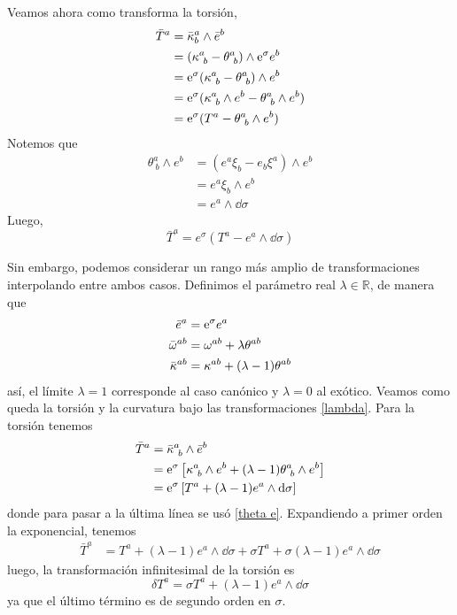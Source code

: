 Veamos ahora como transforma la torsión,
\begin{equation}\label{theta e}
\begin{split}
  \bar{T}^{a}&=\bar{\kappa}^{a}_b\wedge\bar{e}^b\\
  &=(\kappa^{a}_{~b}-\theta^{a}_{~b})\wedge\mathrm{e}^\sigma e^b\\
  &=\mathrm{e}^\sigma (\kappa^{a}_{~b}-\theta^{a}_{~b})\wedge e^b\\
  &=\mathrm{e}^\sigma (\kappa^{a}_{~b}\wedge e^b-\theta^{a}_{~b}\wedge e^b)\\
  &=\mathrm{e}^\sigma (T^{a}-\theta^{a}_{~b}\wedge e^b)
\end{split}
\end{equation}
Notemos que
\begin{equation}\label{theta e2}
\begin{split}
  \theta^{a}_{~b}\wedge e^b&=(e^{a}\xi_b-e_b\xi^{a})\wedge e^b\\
  &=e^{a}\xi_b\wedge e^b\\
  &=e^{a}\wedge\dd\sigma
\end{split}
\end{equation}
Luego,
\begin{equation}
   \boxed{\bar{T}^{a}=e^\sigma (T^{a}-e^{a}\wedge\dd\sigma)}
\end{equation}

Sin embargo, podemos considerar un rango más amplio de transformaciones interpolando entre ambos casos. Definimos el parámetro real $\lambda\in \mathbb{R}$, de manera que
\begin{subequations}\label{lambda}
\begin{align}
  \bar{e}^{a}&=\mathrm{e} ^\sigma e^{a}\label{e lambda}\\
  \bar{\omega}^{ab}&=\omega^{ab}+\lambda\theta^{ab}\label{omega lambda}\\
  \bar{\kappa}^{ab}&=\kappa^{ab}+(\lambda-1)\theta^{ab}\label{kappa lambda}
\end{align}
\end{subequations}
así, el límite $\lambda=1$ corresponde al caso canónico y $\lambda=0$ al exótico. Veamos como queda la torsión y la curvatura bajo las transformaciones \eqref{lambda}. Para la torsión tenemos
\begin{align}
  \bar{T}^{a}&=\bar{\kappa}^{a}_{~b}\wedge\bar{e}^b\\
  &=\mathrm{e}^\sigma\left[\kappa^{a}_{~b}\wedge e^b +(\lambda-1)\theta^{a}_{~b}\wedge e^b\right]\\
  &=\mathrm{e}^\sigma\left[T^{a}+(\lambda-1)e^{a}\wedge \dd\sigma\right]
\end{align}
donde para pasar a la última línea se usó \eqref{theta e}. Expandiendo a primer orden la exponencial, tenemos
\begin{align}
  \bar{T}^{a}&=T^{a}+(\lambda-1)e^{a}\wedge \dd\sigma+\sigma T^{a}+\sigma (\lambda-1)e^{a}\wedge \dd\sigma
\end{align}
luego, la transformación infinitesimal de la torsión es
\begin{equation}
  \boxed{\delta T^{a}=\sigma T^{a}+(\lambda-1)e^{a}\wedge\dd\sigma}
\end{equation}
ya que el último término es de segundo orden en $\sigma$.

